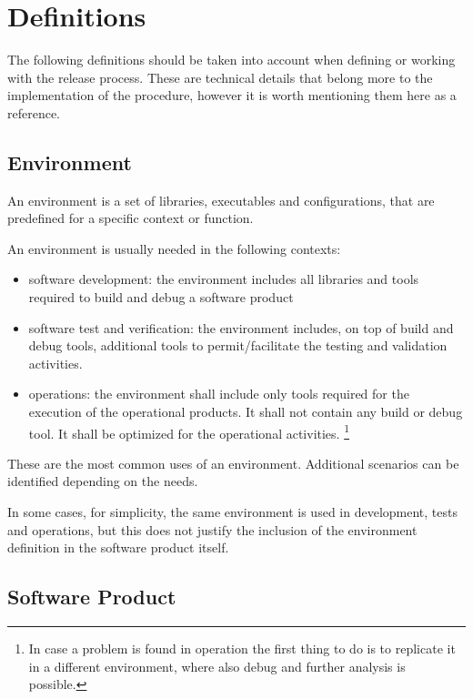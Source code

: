 \section{Definitions} \label{sec:defs}

The following definitions should be taken into account when defining or working with the release process.
These are technical details that belong more to the implementation of the procedure,
however it is worth mentioning them here as a reference.


\subsection{Environment} \label{sec:envdef}

An environment is a set of libraries, executables and configurations, that are predefined for a specific context or function.

An environment is usually needed in the following contexts:

\begin{itemize}
\item software development: the environment includes all libraries and tools required to build and debug a software product
\item software test and verification: the environment includes, on top of build and debug tools, additional tools to permit/facilitate the testing and validation activities.
\item operations: the environment shall include only tools required for the execution of the operational products. It shall not contain any build or debug tool. It shall be optimized for the operational activities. \footnote{In case a problem is found in operation the first thing to do is to replicate it in a different environment, where also debug and further analysis is possible.}
\end{itemize}

These are the most common uses of an environment. Additional scenarios can be identified depending on the needs.

In some cases, for simplicity, the same environment is used in development, tests and operations, but this does not justify the inclusion of the environment definition in the software product itself.


\subsection{Software Product} \label{sec:swdef}

